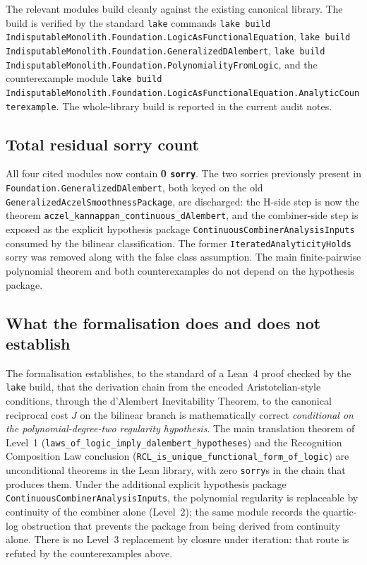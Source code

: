 \documentclass[11pt,a4paper]{article}
\theoremstyle{definition}
\theoremstyle{remark}
\begin{document}
The relevant modules build cleanly against the existing canonical
library. The build is verified by the standard \texttt{lake} commands
\texttt{lake build IndisputableMonolith.Foundation.LogicAsFunctionalEquation},
\texttt{lake build IndisputableMonolith.Foundation.GeneralizedDAlembert},
\texttt{lake build IndisputableMonolith.Foundation.PolynomialityFromLogic},
and the counterexample module
\texttt{lake build IndisputableMonolith.Foundation.LogicAsFunctionalEquation.AnalyticCounterexample}.
The whole-library build is reported in the current audit notes.

\subsection{Total residual sorry count}\label{app:sorry}

All four cited modules now contain \textbf{0 \texttt{sorry}}. The two
sorries previously present in \texttt{Foundation.GeneralizedDAlembert},
both keyed on the old \texttt{GeneralizedAczelSmoothnessPackage}, are
discharged: the H-side step is now the theorem
\texttt{aczel\_kannappan\_continuous\_dAlembert}, and the combiner-side
step is exposed as the explicit hypothesis package
\texttt{ContinuousCombinerAnalysisInputs} consumed by the bilinear
classification. The former \texttt{IteratedAnalyticityHolds} sorry was
removed along with the false class assumption. The main finite-pairwise
polynomial theorem and both counterexamples do not depend on the
hypothesis package.

\subsection{What the formalisation does and does not establish}\label{app:scope}

The formalisation establishes, to the standard of a Lean~4 proof
checked by the \texttt{lake} build, that the derivation chain from
the encoded Aristotelian-style conditions, through the d'Alembert
Inevitability Theorem, to the canonical reciprocal cost $J$ on the
bilinear branch is mathematically correct \emph{conditional on the
polynomial-degree-two regularity hypothesis}. The main translation
theorem of Level~1
(\texttt{laws\_of\_logic\_imply\_dalembert\_hypotheses}) and the
Recognition Composition Law conclusion
(\texttt{RCL\_is\_unique\_functional\_form\_of\_logic}) are
unconditional theorems in the Lean library, with zero \texttt{sorry}s
in the chain that produces them. Under the additional explicit
hypothesis package \texttt{ContinuousCombinerAnalysisInputs}, the
polynomial regularity is replaceable by continuity of the combiner
alone (Level~2); the same module records the quartic-log obstruction
that prevents the package from being derived from continuity alone.
There is no Level~3 replacement by closure under iteration: that route
is refuted by the counterexamples above.
\end{document}
